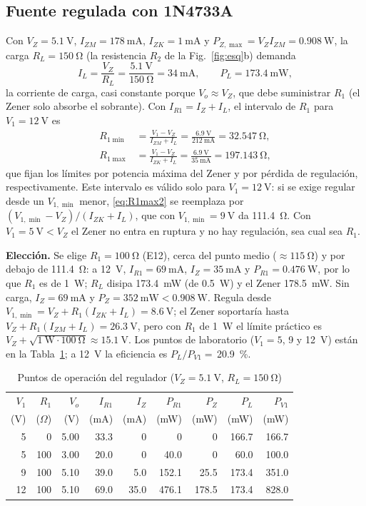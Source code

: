 \documentclass[9pt, conference]{IEEEtran}
\newcommand{\qV}[1]{\SI{#1}{\volt}}
\newcommand{\qmA}[1]{\SI{#1}{\milli\ampere}}
\newcommand{\qohm}[1]{\SI{#1}{\ohm}}
\newcommand{\qmW}[1]{\SI{#1}{\milli\watt}}
\newcommand{\qW}[1]{\SI{#1}{\watt}}
\newcommand{\pct}[1]{\SI{#1}{\percent}}
\begin{document}
\subsection{Fuente regulada con 1N4733A}
Con $V_Z=\qV{5.1}$, $I_{ZM}=\qmA{178}$, $I_{ZK}=\qmA{1}$ y $P_{Z,\max}=V_ZI_{ZM}=\qW{0.908}$, la carga $R_L=\qohm{150}$ (la resistencia $R_2$ de la Fig.~\ref{fig:esq}b) demanda
\begin{equation}
I_L=\frac{V_Z}{R_L}=\frac{\qV{5.1}}{\qohm{150}}=\qmA{34},\qquad P_L=\qmW{173.4},
\label{eq:IL}
\end{equation}
la corriente de carga, casi constante porque $V_o\approx V_Z$, que debe suministrar $R_1$ (el Zener solo absorbe el sobrante). Con $I_{R1}=I_Z+I_L$, el intervalo de $R_1$ para $V_1=\qV{12}$ es
\begin{align}
R_{1\min}&=\frac{V_1-V_Z}{I_{ZM}+I_L}=\frac{\qV{6.9}}{\qmA{212}}=\qohm{32.547},\label{eq:R1min}\\
R_{1\max}&=\frac{V_1-V_Z}{I_{ZK}+I_L}=\frac{\qV{6.9}}{\qmA{35}}=\qohm{197.143},\label{eq:R1max2}
\end{align}
que fijan los límites por potencia máxima del Zener y por pérdida de regulación, respectivamente. Este intervalo es válido solo para $V_1=\qV{12}$: si se exige regular desde un $V_{1,\min}$ menor, \eqref{eq:R1max2} se reemplaza por $(V_{1,\min}-V_Z)/(I_{ZK}+I_L)$, que con $V_{1,\min}=\qV{9}$ da \qohm{111.4}. Con $V_1=\qV{5}<V_Z$ el Zener no entra en ruptura y no hay regulación, sea cual sea $R_1$.

\textbf{Elección.} Se elige $R_1=\qohm{100}$ (E12), cerca del punto medio ($\approx\qohm{115}$) y por debajo de \qohm{111.4}: a \qV{12}, $I_{R1}=\qmA{69}$, $I_Z=\qmA{35}$ y $P_{R1}=\qW{0.476}$, por lo que $R_1$ es de \qW{1}; $R_L$ disipa \qmW{173.4} (de \qW{0.5}) y el Zener \qmW{178.5}. Sin carga, $I_Z=\qmA{69}$ y $P_Z=\qmW{352}<\qW{0.908}$. Regula desde $V_{1,\min}=V_Z+R_1(I_{ZK}+I_L)=\qV{8.6}$; el Zener soportaría hasta $V_Z+R_1(I_{ZM}+I_L)=\qV{26.3}$, pero con $R_1$ de \qW{1} el límite práctico es $V_Z+\sqrt{\qW{1}\cdot\qohm{100}}\approx\qV{15.1}$. Los puntos de laboratorio ($V_1=5$, 9 y \qV{12}) están en la Tabla~\ref{tab:zener2}; a \qV{12} la eficiencia es $P_L/P_{V1}=$\,\pct{20.9}.

\begin{table}[htbp]
\caption{Puntos de operación del regulador ($V_Z=\qV{5.1}$, $R_L=\qohm{150}$)}
\label{tab:zener2}
\centering
\scriptsize
\setlength{\tabcolsep}{2.5pt}
\begin{tabular}{rrrrrrrrr}
\toprule
$V_1$ & $R_1$ & $V_o$ & $I_{R1}$ & $I_Z$ & $P_{R1}$ & $P_Z$ & $P_L$ & $P_{V1}$ \\
(V) & ($\Omega$) & (V) & (mA) & (mA) & (mW) & (mW) & (mW) & (mW) \\
\midrule
5 & 0 & 5.00 & 33.3 & 0 & 0 & 0 & 166.7 & 166.7 \\
5 & 100 & 3.00 & 20.0 & 0 & 40.0 & 0 & 60.0 & 100.0 \\
9 & 100 & 5.10 & 39.0 & 5.0 & 152.1 & 25.5 & 173.4 & 351.0 \\
12 & 100 & 5.10 & 69.0 & 35.0 & 476.1 & 178.5 & 173.4 & 828.0 \\
\bottomrule
\end{tabular}
\end{table}
\end{document}

